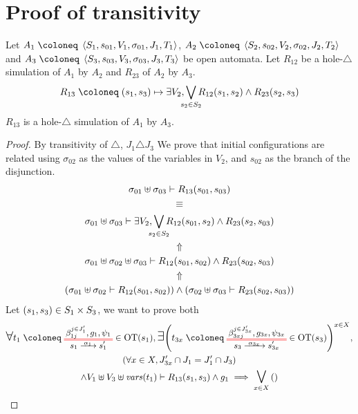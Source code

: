 \documentclass{article}
\begin{document}


\section{Proof of transitivity}\label{apx:trans}
Let \(A_1 \defobject \OAg[1]\), \(A_2 \defobject \OAg[2]\) and \(A_3 \defobject \OAg[3]\) be open automata.
Let \(R_{12}\) be a hole-\(\triangle\) simulation of \(A_1\) by \(A_2\) and \(R_{23}\) of \(A_2\) by \(A_3\).
\[ R_{13} \defobject \mpar{s_1, s_3} \mapsto \exists V_2, \bigvee_\subbox{s_2 \in S_2} R_{12}\mpar{s_1, s_2} \wedge R_{23}\mpar{s_2, s_3} \]
\(R_{13}\) is a hole-\(\triangle\) simulation of \(A_1\) by \(A_3\).
\begin{proof}
 By transitivity of \(\triangle\), \(J_1 \triangle J_3\)
 We prove that initial configurations are related using \(\sigma_{02}\) as the values of the variables in \(V_2\), and \(s_{02}\) as the branch of the disjunction.
\begin{gather*}
	\sigma_{01} \uplus \sigma_{03} \vdash R_{13}\mpar{s_{01}, s_{03}} \\
	\equiv \\
	\sigma_{01} \uplus \sigma_{03} \vdash \exists V_2, \bigvee_\subbox{s_2 \in S_2} R_{12}\mpar{s_{01}, s_2} \wedge R_{23}\mpar{s_2, s_{03}} \\
	\Uparrow \\
	\sigma_{01} \uplus \sigma_{02} \uplus \sigma_{03} \vdash R_{12}\mpar{s_{01}, s_{02}} \wedge R_{23}\mpar{s_{02}, s_{03}} \\
	\Uparrow \\
	\mpar{\sigma_{01} \uplus \sigma_{02} \vdash R_{12}\mpar{s_{01}, s_{02}}} \wedge \mpar{\sigma_{02} \uplus \sigma_{03} \vdash R_{23}\mpar{s_{02}, s_{03}}}
\end{gather*}
 Let \({\left(s_1, s_3\right)} \in S_1 \times S_3\), we want to prove both
\begin{multline}
	\bigsymb{\forall} t_1 \defobject \OTx{1}{}{1}{1} \in \fOT{s_1}, \bigsymb{\exists} \mpar{t_{3x} \defobject \OTx{3}{x}{3x}{3x} \in \fOT{s_3}}^{x \in X}, \\
	\mpar{\forall x \in X, J'_{3x} \cap J_1 = J'_1 \cap J_3} \\
	\wedge V_1 \uplus V_3 \uplus \fvars{t_1} \vdash R_{13}\mpar{s_1, s_3} \wedge g_1 \implies \operatorname*{\bigsymb{\bigvee}}_{x \in X} \mpar{\everymath{\displaystyle}\begin{array}{l}

\end{array}}
\end{multline}
\end{proof}
\end{document}
